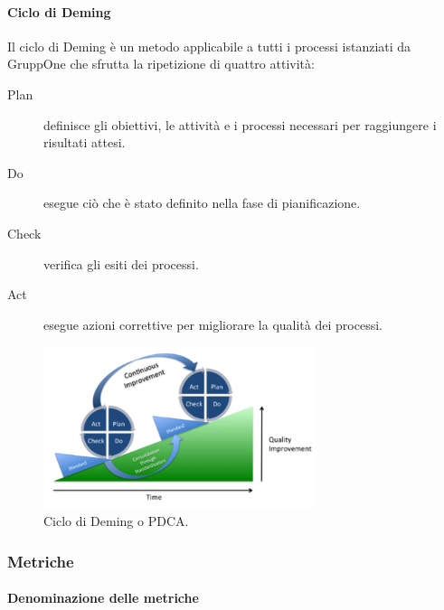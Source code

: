 \documentclass[../../norme-di-progetto.tex]{subfiles}
\begin{document}
\paragraph{Ciclo di Deming}%
\label{par:ciclo_di_deming}

Il ciclo di Deming è un metodo applicabile a tutti i processi istanziati da GruppOne che sfrutta la ripetizione di quattro attività:

\begin{description}
  \item [Plan] definisce gli obiettivi, le attività e i processi necessari per raggiungere i risultati attesi.
  \item [Do] esegue ciò che è stato definito nella fase di pianificazione.
  \item [Check] verifica gli esiti dei processi.
  \item [Act] esegue azioni correttive per migliorare la qualità dei processi.
\end{description}

\begin{figure}[H]
  \includegraphics[width=8cm]{PDCA-process.png}
  \centering
  \caption{Ciclo di Deming o PDCA.}%
  \label{fig:ciclo_di_deming}
\end{figure}

\subsubsection{Metriche}%
\label{subs:accertamento_della_qualita/metriche}

\paragraph{Denominazione delle metriche}%
\label{par:denominazione_delle_metriche}
\end{document}
